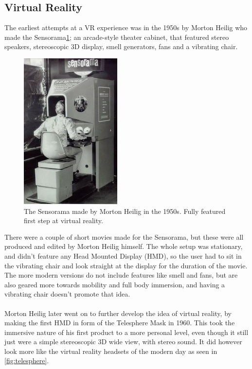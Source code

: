 		\subsection{Virtual Reality}
			The earliest attempts at a VR experience was in the 1950s\cite{VRS} by Morton Heilig who made the Sensorama\ref{fig:sensorama}; an arcade-style theater cabinet, that featured stereo speakers, stereoscopic 3D display, smell generators, fans and a vibrating chair.
			\begin{figure}[H]
				\centering
				\includegraphics[width=0.4\linewidth]{figure/Analysis/sensorama2}
				\caption{The Sensorama made by Morton Heilig in the 1950s. Fully featured first step at virtual reality.}
				\label{fig:sensorama}
			\end{figure}
			There were a couple of short movies made for the Sensorama, but these were all produced and edited by Morton Heilig himself. The whole setup was stationary, and didn't feature any Head Mounted Display (HMD), so the user had to sit in the vibrating chair and look straight at the display for the duration of the movie. The more modern versions do not include features like smell and fans, but are also geared more towards mobility and full body immersion, and having a vibrating chair doesn't promote that idea.\\\\\texttt{}
			Morton Heilig later went on to further develop the idea of virtual reality, by making the first HMD in form of the Telesphere Mask\cite{VRS} in 1960. This took the immersive nature of his first product to a more personal level, even though it still just were a simple stereoscopic 3D wide view, with stereo sound. It did however look more like the virtual reality headsets of the modern day as seen in \autoref{fig:telesphere}.
